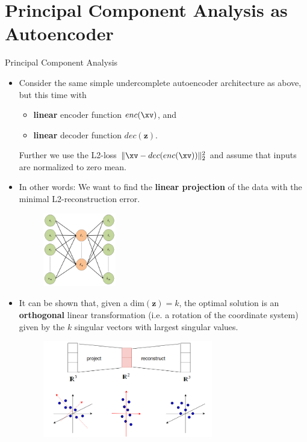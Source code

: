 \section{Principal Component Analysis as Autoencoder}

\begin{vbframe}{Principal Component Analysis}

  \begin{itemize}
    \item Consider the same simple undercomplete autoencoder architecture as above, but this time with
    \begin{itemize}
      \item \textbf{linear} encoder function $enc(\xv)$, and
      \item \textbf{linear} decoder function $dec(\pmb{z})$.
    \end{itemize}  
    Further we use the L2-loss $\|\xv-dec(enc(\xv))\|^2_2$ and assume that inputs are normalized to zero mean.   
    \item In other words: We want to find the \textbf{linear projection} of the data with the minimal L2-reconstruction error.

    \begin{figure}
      \centering
      \includegraphics[width=0.3\textwidth]{plots/autoencoder_mnist_example.png}
    \end{figure}

    \framebreak 

    \item It can be shown that, given a $\text{dim}(\bm{z}) = k$, the optimal solution is an \textbf{orthogonal} linear transformation (i.e. a rotation of the coordinate system) given by the $k$ singular vectors with largest singular values. 

    \begin{figure}
    \centering
    \includegraphics[width=0.7\textwidth]{plots/PCA_AE.png}
    \end{figure}


\end{itemize}
\end{vbframe}
